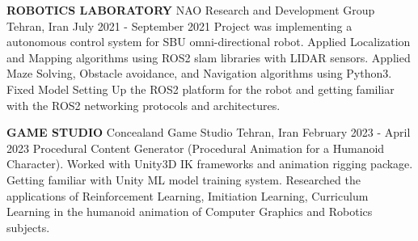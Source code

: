 \begin{cventries}
	
    \cventry
    {\textbf{ROBOTICS LABORATORY}}
    {NAO Research and Development Group}
    {Tehran, Iran}
    {July 2021 - September 2021}
    {Project was implementing a autonomous control system for SBU omni-directional robot. Applied Localization and Mapping algorithms using ROS2 slam libraries with LIDAR sensors. \newline Applied Maze Solving, Obstacle avoidance, and Navigation algorithms using Python3. \newline Fixed Model \newline Setting Up the ROS2 platform for the robot and getting familiar with the ROS2 networking protocols and architectures.}   
    
\end{cventries}
\vspace{0.7 cm}
\begin{cventries}
	
    \cventry
    {\textbf{GAME STUDIO}}
    {Concealand Game Studio}
    {Tehran, Iran}
    {February 2023 - April 2023}
    {Procedural Content Generator (Procedural Animation for a Humanoid Character). \newline Worked with Unity3D IK frameworks and animation rigging package. \newline Getting familiar with Unity ML model training system. \newline Researched the applications of Reinforcement Learning, Imitiation Learning, Curriculum Learning in the humanoid animation of Computer Graphics and Robotics subjects.}   
    
\end{cventries}

